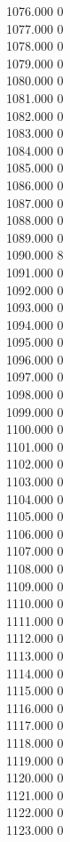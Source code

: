 { 1076.000	0 \\
 1077.000	0 \\
 1078.000	0 \\
 1079.000	0 \\
 1080.000	0 \\
 1081.000	0 \\
 1082.000	0 \\
 1083.000	0 \\
 1084.000	0 \\
 1085.000	0 \\
 1086.000	0 \\
 1087.000	0 \\
 1088.000	0 \\
 1089.000	0 \\
 1090.000	8 \\
 1091.000	0 \\
 1092.000	0 \\
 1093.000	0 \\
 1094.000	0 \\
 1095.000	0 \\
 1096.000	0 \\
 1097.000	0 \\
 1098.000	0 \\
 1099.000	0 \\
 1100.000	0 \\
 1101.000	0 \\
 1102.000	0 \\
 1103.000	0 \\
 1104.000	0 \\
 1105.000	0 \\
 1106.000	0 \\
 1107.000	0 \\
 1108.000	0 \\
 1109.000	0 \\
 1110.000	0 \\
 1111.000	0 \\
 1112.000	0 \\
 1113.000	0 \\
 1114.000	0 \\
 1115.000	0 \\
 1116.000	0 \\
 1117.000	0 \\
 1118.000	0 \\
 1119.000	0 \\
 1120.000	0 \\
 1121.000	0 \\
 1122.000	0 \\
 1123.000	0 \\
}
